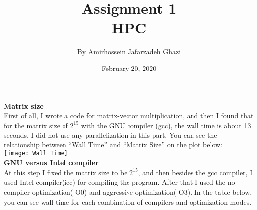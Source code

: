 \documentclass[12pt]{article}
\title{Assignment 1\\HPC}
\author{By Amirhossein Jafarzadeh Ghazi}
\date{February 20, 2020}
\begin{document}
\begin{titlepage}
\maketitle
\end{titlepage}
\textbf{Matrix size}\\
First of all, I wrote a code for matrix-vector multiplication, and then I found that for the matrix size of $2^{15}$ with the GNU compiler (gcc), the wall time is about 13 seconds. I did not use any parallelization in this part.  You can see the relationship between “Wall Time” and “Matrix Size” on the plot below:\\

{\centering
\texttt{[image: Wall Time]}\\}
\hfill \break
\textbf{GNU versus Intel compiler}\\
At this step I fixed the matrix size to be $2^{15}$, and then besides the gcc compiler, I used Intel compiler(icc) for compiling the program. After that I used the no compiler optimization(-O0) and aggressive optimization(-O3). In the table below, you can see wall time for each combination of compilers and optimization modes.\\
\end{document}
